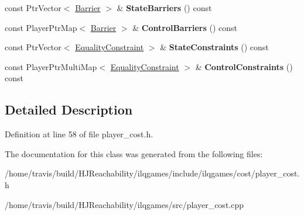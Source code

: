 \begin{DoxyCompactItemize}
\item 
const Ptr\+Vector$<$ \hyperlink{classilqgames_1_1_barrier}{Barrier} $>$ \& {\bfseries State\+Barriers} () const \hypertarget{classilqgames_1_1_player_cost_a7a6ec650d903f9da305b1bc2ac10c514}{}\label{classilqgames_1_1_player_cost_a7a6ec650d903f9da305b1bc2ac10c514}

\item 
const Player\+Ptr\+Map$<$ \hyperlink{classilqgames_1_1_barrier}{Barrier} $>$ \& {\bfseries Control\+Barriers} () const \hypertarget{classilqgames_1_1_player_cost_adb8bb0c60d77c86d212550ab87cd8ba2}{}\label{classilqgames_1_1_player_cost_adb8bb0c60d77c86d212550ab87cd8ba2}

\item 
const Ptr\+Vector$<$ \hyperlink{classilqgames_1_1_equality_constraint}{Equality\+Constraint} $>$ \& {\bfseries State\+Constraints} () const \hypertarget{classilqgames_1_1_player_cost_a0887bc7f840ec900ab84048a66d8b96d}{}\label{classilqgames_1_1_player_cost_a0887bc7f840ec900ab84048a66d8b96d}

\item 
const Player\+Ptr\+Multi\+Map$<$ \hyperlink{classilqgames_1_1_equality_constraint}{Equality\+Constraint} $>$ \& {\bfseries Control\+Constraints} () const \hypertarget{classilqgames_1_1_player_cost_a048ee53fa0e664e1ebc12026332b96be}{}\label{classilqgames_1_1_player_cost_a048ee53fa0e664e1ebc12026332b96be}

\end{DoxyCompactItemize}


\subsection{Detailed Description}


Definition at line 58 of file player\+\_\+cost.\+h.



The documentation for this class was generated from the following files\+:\begin{DoxyCompactItemize}
\item 
/home/travis/build/\+H\+J\+Reachability/ilqgames/include/ilqgames/cost/player\+\_\+cost.\+h\item 
/home/travis/build/\+H\+J\+Reachability/ilqgames/src/player\+\_\+cost.\+cpp\end{DoxyCompactItemize}
